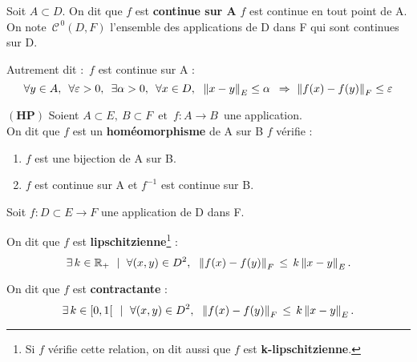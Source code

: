 \vspace{0.3cm}

\noindent Soit $A\subset D$. On dit que $f$ est \textbf{continue sur A} \ssi $f$ est continue en tout point de A. On note \(\,\mathscr{C}^{\,0}(D,F)\) l'ensemble des applications de D dans F qui sont continues sur D.

\vspace{0.2cm}

Autrement dit : \(\,f\) est continue sur A \ssi :\vspace{-0.25cm}
\[\forall y\in A,\ \,\forall \varepsilon >0,\ \, \exists \alpha >0,\ \, \forall x\in D,\ \; \norm{x-y}_E \leq \alpha \ \, \Rightarrow \ \norm{f(x)-f(y)}_F\leq \varepsilon\]

\vspace{1.3cm}

\(\left(\mathbf{HP}\right)\) Soient \(A\subset E,\ B\subset F\,\text{ et }\, f:A\to B\,\) une application.\vspace{0.1cm}\\
On dit que $f$ est un \textbf{homéomorphisme} de A sur B \ssi $f$ vérifie :
\begin{enumerate}[leftmargin=2cm,label=(\arabic*).]
    \item $f$ est une bijection de A sur B.
    \item $f$ est continue sur A et $f^{-1}$ est continue sur B.
\end{enumerate}

\vspace{1.3cm}

\noindent Soit \(f:D\subset E\to F\) une application de D dans F.

\vspace{0.3cm}

On dit que $f$ est \textbf{lipschitzienne}\footnote{Si $f$ vérifie cette relation, on dit aussi que $f$ est \textbf{k-lipschitzienne}.} \ssi :\vspace{-0.25cm} \[\exists\, k \in \RR_+ \ \mid \ \forall(x,y)\in D^2,\ \; \norm{f(x)-f(y)}_F\,\leq\, k\norm{x-y}_E.\vspace{0.1cm}\]

On dit que $f$ est \textbf{contractante} \ssi : \vspace{-0.25cm} \[\exists\,k\in [0,1[\ \ \mid \ \forall(x,y)\in D^2,\ \; \left\lVert f(x)-f(y)\right\rVert_F\,\leq\, k\left\lVert x-y\right\rVert_E.\]


